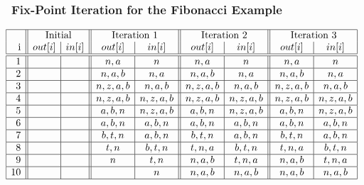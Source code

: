 \documentclass{beamer}
\begin{document}
\begin{frame}
\frametitle{Fix-Point Iteration for the Fibonacci Example}

\renewcommand{\arraystretch}{0.9}

\newlength{\savesep}
\setlength{\savesep}{\arraycolsep}
\setlength{\arraycolsep}{0.65ex}

\[\hspace{-4ex}\begin{array}{|r||c|c||c|c||c|c||c|c|} \hline
    & \multicolumn{2}{c||}{\mbox{Initial}}
    & \multicolumn{2}{c||}{\mbox{Iteration 1}}
    & \multicolumn{2}{c||}{\mbox{Iteration 2}}
    & \multicolumn{2}{c|}{\mbox{Iteration 3}} \\

$i$ & out[i] & in[i] &
      out[i] & in[i] &
      out[i] & in[i] &
      out[i] & in[i] \\\hline\hline

1   &        &       &
      n,a    & n     &
      n,a    & n     &
      n,a    & n     \\\hline

2   &        &       &
      n,a,b  & n,a   &
      n,a,b  & n,a   &
      n,a,b  & n,a   \\\hline

3   &        &       &
     n,z,a,b & n,a,b &
     n,z,a,b & n,a,b &
     n,z,a,b & n,a,b \\\hline

4   &        &       &
     n,z,a,b & n,z,a,b &
     n,z,a,b & n,z,a,b &
     n,z,a,b & n,z,a,b \\\hline

5   &        &       &
     a,b,n   & n,z,a,b &
     a,b,n   & n,z,a,b &
     a,b,n   & n,z,a,b \\\hline

6   &        &       &
     a,b,n   & a,b,n &
     a,b,n   & a,b,n &
     a,b,n   & a,b,n \\\hline

7   &        &       &
     b,t,n   & a,b,n &
     b,t,n   & a,b,n &
     b,t,n   & a,b,n \\\hline

8   &        &       &
     t,n     & b,t,n &
     t,n,a   & b,t,n &
     t,n,a   & b,t,n \\\hline

9   &        &       &
     n       & t,n   &
     n,a,b   & t,n,a &
     n,a,b   & t,n,a \\\hline

10   &        &       &
              & n     &
     n,a,b    & n,a,b &
     n,a,b    & n,a,b \\\hline


\end{array}\]
\end{frame}
\end{document}
